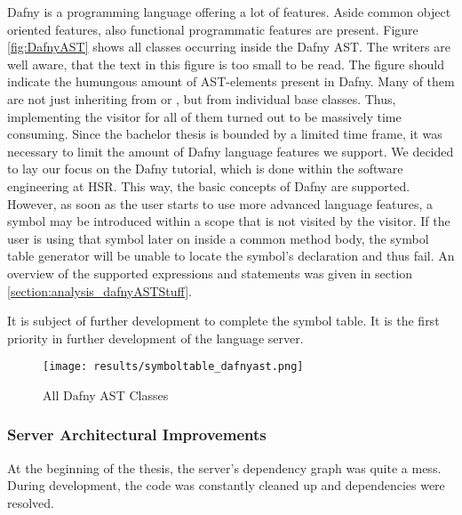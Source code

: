 Dafny is a programming language offering a lot of features.
Aside common object oriented features, also functional programmatic features are present.
Figure \ref{fig:DafnyAST} shows all classes occurring inside the Dafny AST.
The writers are well aware, that the text in this figure is too small to be read.
The figure should indicate the humungous amount of AST-elements present in Dafny.
Many of them are not just inheriting from  or , but from individual base classes.
Thus, implementing the visitor for all of them turned out to be massively time consuming.
Since the bachelor thesis is bounded by a limited time frame, it was necessary to limit the amount of Dafny language features we support.
We decided to lay our focus on the Dafny tutorial, which is done within the software engineering at HSR.
This way, the basic concepts of Dafny are supported.
However, as soon as the user starts to use more advanced language features, a symbol may be introduced within a scope that is not visited by the visitor.
If the user is using that symbol later on inside a common method body, the symbol table generator will be unable to locate the symbol's declaration and thus fail.
An overview of the supported expressions and statements was given in section \ref{section:analysis_dafnyASTStuff}.\\


It is subject of further development to complete the symbol table.
It is the first priority in further development of the language server.
\begin{figure}[h]
    \centering
    \texttt{[image: results/symboltable\_dafnyast.png]}
    \caption{All Dafny AST Classes}
    \label{fig:dafnyASTOverview}
\end{figure}

\subsubsection{Server Architectural Improvements}
At the beginning of the thesis, the server's dependency graph was quite a mess.
During development, the code was constantly cleaned up and dependencies were resolved.

